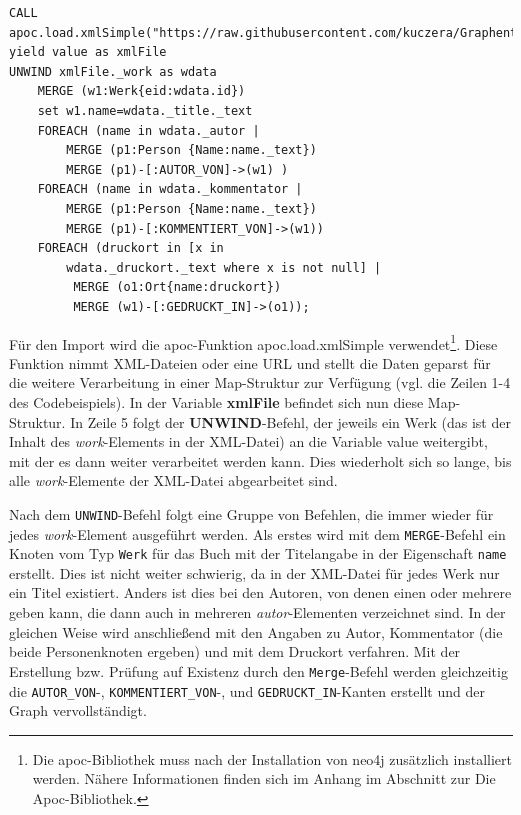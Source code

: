\documentclass[ngerman,]{scrreprt}
\begin{document}
\begin{verbatim}
CALL apoc.load.xmlSimple("https://raw.githubusercontent.com/kuczera/Graphentechnologien/master/docs/data/kollatz.xml") yield value as xmlFile
UNWIND xmlFile._work as wdata
    MERGE (w1:Werk{eid:wdata.id})
    set w1.name=wdata._title._text
    FOREACH (name in wdata._autor |
        MERGE (p1:Person {Name:name._text})
        MERGE (p1)-[:AUTOR_VON]->(w1) )
    FOREACH (name in wdata._kommentator |
        MERGE (p1:Person {Name:name._text})
        MERGE (p1)-[:KOMMENTIERT_VON]->(w1))
    FOREACH (druckort in [x in
        wdata._druckort._text where x is not null] |
         MERGE (o1:Ort{name:druckort})
         MERGE (w1)-[:GEDRUCKT_IN]->(o1));
\end{verbatim}

Für den Import wird die apoc-Funktion apoc.load.xmlSimple verwendet\footnote{Die apoc-Bibliothek muss nach der Installation von neo4j zusätzlich installiert werden. Nähere Informationen finden sich im Anhang im Abschnitt zur Die Apoc-Bibliothek.}. Diese Funktion nimmt XML-Dateien oder eine URL und stellt die Daten geparst für die weitere Verarbeitung in einer Map-Struktur zur Verfügung (vgl. die Zeilen 1-4 des Codebeispiels). In der Variable \textbf{xmlFile} befindet sich nun diese Map-Struktur. In Zeile 5 folgt der \textbf{UNWIND}-Befehl, der jeweils ein Werk (das ist der Inhalt des \emph{work}-Elements in der XML-Datei) an die Variable value weitergibt, mit der es dann weiter verarbeitet werden kann. Dies wiederholt sich so lange, bis alle \emph{work}-Elemente der XML-Datei abgearbeitet sind.

Nach dem \texttt{UNWIND}-Befehl folgt eine Gruppe von Befehlen, die immer wieder für jedes \emph{work}-Element ausgeführt werden. Als erstes wird mit dem \texttt{MERGE}-Befehl ein Knoten vom Typ \texttt{Werk} für das Buch mit der Titelangabe in der Eigenschaft \texttt{name} erstellt. Dies ist nicht weiter schwierig, da in der XML-Datei für jedes Werk nur ein Titel existiert. Anders ist dies bei den Autoren, von denen einen oder mehrere geben kann, die dann auch in mehreren \emph{autor}-Elementen verzeichnet sind. In der gleichen Weise wird anschließend mit den Angaben zu Autor, Kommentator (die beide Personenknoten ergeben) und mit dem Druckort verfahren. Mit der Erstellung bzw. Prüfung auf Existenz durch den \texttt{Merge}-Befehl werden gleichzeitig die \texttt{AUTOR\_VON}-, \texttt{KOMMENTIERT\_VON}-, und \texttt{GEDRUCKT\_IN}-Kanten erstellt und der Graph vervollständigt.
\end{document}
